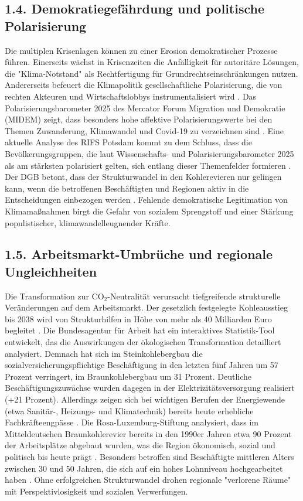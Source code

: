 \documentclass[12pt, a4paper]{article}
\begin{document}
	\subsection*{1.4. Demokratiegefährdung und politische Polarisierung}
	Die multiplen Krisenlagen können zu einer Erosion demokratischer Prozesse führen.
	Einerseits wächst in Krisenzeiten die Anfälligkeit für autoritäre Lösungen, die
	"Klima-Notstand" als Rechtfertigung für Grundrechtseinschränkungen nutzen.
	Andererseits befeuert die Klimapolitik gesellschaftliche Polarisierung, die von
	rechten Akteuren und Wirtschaftslobbys instrumentalisiert wird \cite{westheuser2025}.
	Das Polarisierungsbarometer 2025 des Mercator Forum Migration und Demokratie (MIDEM)
	zeigt, dass besonders hohe affektive Polarisierungswerte bei den Themen Zuwanderung,
	Klimawandel und Covid-19 zu verzeichnen sind \cite{polarisierung2025}. Eine aktuelle
	Analyse des RIFS Potsdam kommt zu dem Schluss, dass die Bevölkerungsgruppen, die laut
	Wissenschafts- und Polarisierungsbarometer 2025 als am stärksten polarisiert gelten,
	sich entlang dieser Themenfelder formieren \cite{rifs2025}. Der DGB betont, dass der
	Strukturwandel in den Kohlerevieren nur gelingen kann, wenn die betroffenen
	Beschäftigten und Regionen aktiv in die Entscheidungen einbezogen werden \cite{dgb2025}.
	Fehlende demokratische Legitimation von Klimamaßnahmen birgt die Gefahr von sozialem
	Sprengstoff und einer Stärkung populistischer, klimawandelleugnender Kräfte.
	
	\subsection*{1.5. Arbeitsmarkt-Umbrüche und regionale Ungleichheiten}
	Die Transformation zur CO$_2$-Neutralität verursacht tiefgreifende strukturelle
	Veränderungen auf dem Arbeitsmarkt. Der gesetzlich festgelegte Kohleausstieg bis
	2038 wird von Strukturhilfen in Höhe von mehr als 40 Milliarden Euro begleitet
	\cite{dgb2025}. Die Bundesagentur für Arbeit hat ein interaktives Statistik-Tool
	entwickelt, das die Auswirkungen der ökologischen Transformation detailliert analysiert.
	Demnach hat sich im Steinkohlebergbau die sozialversicherungspflichtige Beschäftigung
	in den letzten fünf Jahren um 57 Prozent verringert, im Braunkohlebergbau um
	31 Prozent. Deutliche Beschäftigungszuwächse wurden dagegen in der Elektrizitätsversorgung
	realisiert (+21 Prozent). Allerdings zeigen sich bei wichtigen Berufen der Energiewende
	(etwa Sanitär-, Heizungs- und Klimatechnik) bereits heute erhebliche Fachkräfteengpässe
	\cite{ba2025}. Die Rosa-Luxemburg-Stiftung analysiert, dass im Mitteldeutschen
	Braunkohlerevier bereits in den 1990er Jahren etwa 90 Prozent der Arbeitsplätze
	abgebaut wurden, was die Region ökonomisch, sozial und politisch bis heute prägt
	\cite{rosalux2025}. Besonders betroffen sind Beschäftigte mittleren Alters zwischen
	30 und 50 Jahren, die sich auf ein hohes Lohnniveau hochgearbeitet haben
	\cite{klimareporter2024}. Ohne erfolgreichen Strukturwandel drohen regionale
	"verlorene Räume" mit Perspektivlosigkeit und sozialen Verwerfungen.
	
\end{document}
